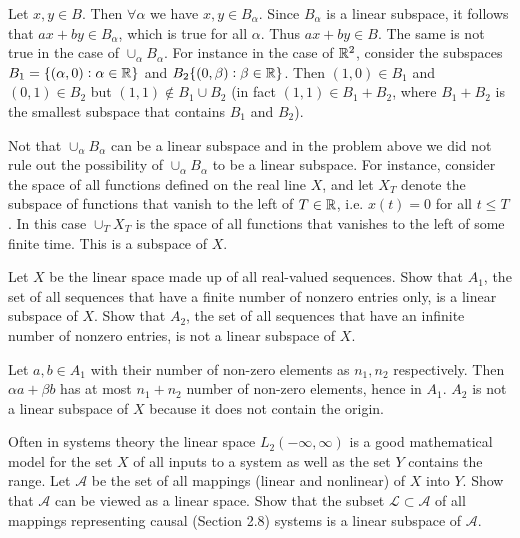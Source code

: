 \begin{solution}
	Let $ x,y \in B $. Then $ \forall \alpha $ we have $ x,y\in B_\alpha $. Since $ B_\alpha $ is a linear subspace, it follows that $ ax + by \in B_\alpha $, which is true for all $ \alpha $. Thus $ ax+by \in B $. The same is not true in the case of $ \cup_\alpha B_\alpha $. For instance in the case of $ \mathbb{R}^2 $, consider the subspaces $ B_1 = \{(\alpha,0):\alpha\in\mathbb{R}\} $ and $ B_2\{(0,\beta):\beta\in\mathbb{R}\} $. Then $ (1,0)\in B_1 $ and $ (0,1)\in B_2 $ but $ (1,1) \notin B_1\cup B_2 $ (in fact $ (1,1) \in B_1+B_2 $, where $ B_1+B_2 $ is the smallest subspace that contains $ B_1 $ and $ B_2 $).
\end{solution}
\begin{remark}
	Not that $ \cup_\alpha B_\alpha $ can be a linear subspace and in the problem above we did not rule out the possibility of $ \cup_\alpha B_\alpha $ to be a linear subspace. For instance, consider the space of all functions defined on the real line $ X $, and let $ X_T $ denote the subspace of functions that vanish to the left of $ T\in\mathbb{R} $, i.e. $ x(t) = 0 $ for all $ t\leq T $. In this case $ \cup_T X_T $ is the space of all functions that vanishes to the left of some finite time. This is a subspace of $ X $.
\end{remark}


\begin{problem}
	Let $ X $ be the linear space made up of all real-valued sequences. Show that $ A_1 $, the set of all sequences that have a finite number of nonzero entries only, is a linear subspace of $ X $. Show that $ A_2 $, the set of all sequences that have an infinite number of nonzero entries, is not a linear subspace of $ X $.
\end{problem}

\begin{solution}
	Let $ a,b\in A_1 $ with their number of non-zero elements as $ n_1,n_2 $ respectively. Then $ \alpha a+ \beta b $ has at most $ n_1+n_2 $ number of non-zero elements, hence in $ A_1 $. $ A_2 $ is not a linear subspace of $ X $ because it does not contain the origin.
\end{solution}



\begin{problem}
	Often in systems theory the linear space $ L_2(-\infty,\infty) $ is a good mathematical model for the set $ X $ of all inputs to a system as well as the set $ Y $ contains the range. Let $ \mathcal{A} $ be the set of all mappings (linear and nonlinear) of $ X $ into $ Y $. Show that $ \mathcal{A} $ can be viewed as a linear space. Show that the subset $ \mathcal{L} \subset \mathcal{A} $ of all mappings representing causal (Section 2.8) systems is a linear subspace of $ \mathcal{A} $.
\end{problem}

